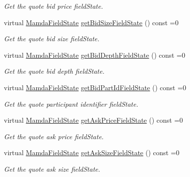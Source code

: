 \begin{CompactItemize}
\begin{CompactList}\small\item\em Get the quote bid price field\-State. \item\end{CompactList}\item 
virtual \hyperlink{namespaceWombat_93aac974f2ab713554fd12a1fa3b7d2a}{Mamda\-Field\-State} \hyperlink{classWombat_1_1MamdaQuoteUpdate_900615e9e035465932a232bf375cd662}{get\-Bid\-Size\-Field\-State} () const =0
\begin{CompactList}\small\item\em Get the quote bid size field\-State. \item\end{CompactList}\item 
virtual \hyperlink{namespaceWombat_93aac974f2ab713554fd12a1fa3b7d2a}{Mamda\-Field\-State} \hyperlink{classWombat_1_1MamdaQuoteUpdate_b40779149909af89e8fb52ef50382826}{get\-Bid\-Depth\-Field\-State} () const =0
\begin{CompactList}\small\item\em Get the quote bid depth field\-State. \item\end{CompactList}\item 
virtual \hyperlink{namespaceWombat_93aac974f2ab713554fd12a1fa3b7d2a}{Mamda\-Field\-State} \hyperlink{classWombat_1_1MamdaQuoteUpdate_6fe2cb5a01e258527dc254719b392ec0}{get\-Bid\-Part\-Id\-Field\-State} () const =0
\begin{CompactList}\small\item\em Get the quote participant identifier field\-State. \item\end{CompactList}\item 
virtual \hyperlink{namespaceWombat_93aac974f2ab713554fd12a1fa3b7d2a}{Mamda\-Field\-State} \hyperlink{classWombat_1_1MamdaQuoteUpdate_4cf2bd78fd61f69aaafc8ed4af31b3b8}{get\-Ask\-Price\-Field\-State} () const =0
\begin{CompactList}\small\item\em Get the quote ask price field\-State. \item\end{CompactList}\item 
virtual \hyperlink{namespaceWombat_93aac974f2ab713554fd12a1fa3b7d2a}{Mamda\-Field\-State} \hyperlink{classWombat_1_1MamdaQuoteUpdate_652ce021514fb63b79c95c95783ae418}{get\-Ask\-Size\-Field\-State} () const =0
\begin{CompactList}\small\item\em Get the quote ask size field\-State. \item\end{CompactList}\item 

\end{CompactItemize}
